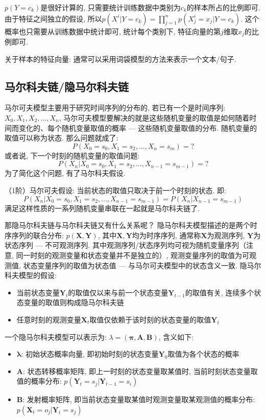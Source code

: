 $p(Y=c_k)$是很好计算的, 只需要统计训练数据中类别为$c_k$的样本所占的比例即可. 由于特征之间独立的假设, 所以$p(X^i | Y=c_k) = \prod_{j=1}^{n} p(X_{j}^{i}=x_j | Y=c_k)$. 这个概率也只需要从训练数据中统计即可, 统计每个类别下, 特征向量的第$j$维取$x_j$的比例即可. 

关于样本的特征向量: 通常可以采用词袋模型的方法来表示一个文本/句子. 

\subsection{马尔科夫链/隐马尔科夫链}
马尔可夫模型主要用于研究时间序列的分布的, 若已有一个是时间序列: $X_0, X_1, X_2, ..., X_n$, 马尔可夫模型要解决的就是这些随机变量的取值是如何随着时间而变化的、每个随机变量取值的概率 --- 这些随机变量取值的分布. 随机变量的取值可以称为状态. 那么问题就成了: 
$$
P(X_0=s_0, X_1=s_2, ..., X_n=s_m) = ?
$$
或者说, 下一个时刻的随机变量的取值问题: 
$$
P(X_n | X_0=s_0, X_1=s_2, ..., X_{n-1}=s_{m-1}) = ?
$$
为了简化这个问题, 有了马尔科夫假设. 

（1阶）马尔可夫假设: 当前状态的取值只取决于前一个时刻的状态. 即: 
$$
P(X_n | X_0=s_0, X_1=s_2, ..., X_{n-1}=s_{m-1}) = P(X_n | X_{n-1}=s_{m-1})
$$
满足这样性质的一系列随机变量串联在一起就是马尔科夫链了. 

那隐马尔科夫链与马尔科夫链又有什么关系呢？
隐马尔科夫模型描述的是两个时序序列的联合分布: $p( \boldsymbol{X}, \boldsymbol{Y} )$, 其中$\boldsymbol{X}, \boldsymbol{Y}$均为时序序列, 通常称$\boldsymbol{X}$为观测序列, $\boldsymbol{Y}$为状态序列 --- 不可观测序列. 其中观测序列/状态序列均可视为随机变量序列（注意, 同一时刻的观测变量和状态变量并不是独立的）, 观测变量序列的取值为可观测值, 状态变量序列的取值为状态值 --- 与马尔可夫模型中的状态含义一致. 隐马尔科夫模型的假设: 
\begin{itemize}
	\item 当前状态变量$\boldsymbol{Y}_t$的取值仅以来与前一个状态变量$\boldsymbol{Y}_{t-1}$的取值有关, 连续多个状态变量的取值则构成隐马尔科夫链
	\item 任意时刻的观测变量$\boldsymbol{X}_t$取值仅依赖于该时刻的状态变量的取值$\boldsymbol{Y}_t$
\end{itemize}

一个隐马尔科夫模型可以表示为: $\lambda = (\boldsymbol{\pi}, \boldsymbol{A}, \boldsymbol{B})$, 含义如下: 
\begin{itemize}
	\item $\boldsymbol{\lambda}$: 初始状态概率向量, 即初始时刻的状态变量$\boldsymbol{Y}_0$取值为各个状态的概率
	\item $\boldsymbol{A}$: 状态转移概率矩阵, 即上一时刻的状态变量取某值时, 当前时刻状态变量取值的概率分布: $p(\boldsymbol{Y}_t=s_j | \boldsymbol{Y}_{t-1}=s_i)$
	\item $\boldsymbol{B}$: 发射概率矩阵, 即当前状态变量取某值时观测变量取某观测值的概率分布: $p(\boldsymbol{X}_t=o_j | \boldsymbol{Y}_t=s_j)$
\end{itemize}

